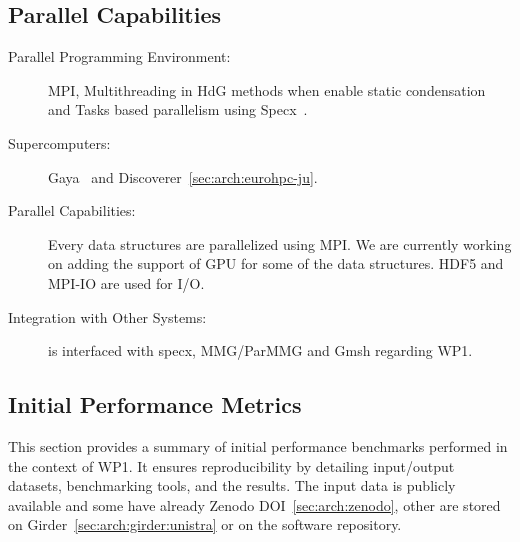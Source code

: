 \subsection{Parallel Capabilities}
\label{sec:WP1:Feelpp:performances}


\begin{description}
    \item[Parallel Programming Environment:]  MPI, Multithreading in HdG methods when enable static condensation and Tasks based parallelism using Specx~\cite{cardosi_specx_2023}.
    \item[Supercomputers:] Gaya~ and Discoverer~\cref{sec:arch:eurohpc-ju}.
    \item[Parallel Capabilities:] Every data structures are parallelized using MPI. We are currently working on adding the support of GPU for some of the data structures. HDF5 and MPI-IO are used for I/O.
    \item[Integration with Other Systems:] \Feelpp is interfaced with specx, MMG/ParMMG and Gmsh regarding WP1.
\end{description}



\subsection{Initial Performance Metrics}
\label{sec:WP1:Feelpp:metrics}

This section provides a summary of initial performance benchmarks performed in the context of WP1. 
It ensures reproducibility by detailing input/output datasets, benchmarking tools, and the results. 
The input data is publicly available and some have already Zenodo DOI~\cref{sec:arch:zenodo}, other are stored on Girder~\cref{sec:arch:girder:unistra} or on the software repository.

